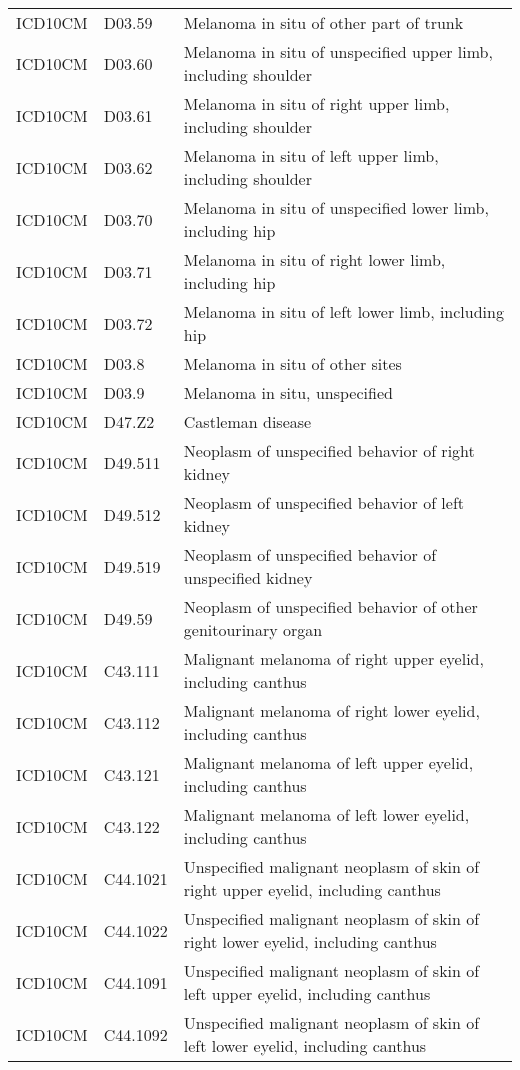 \begin{longtable}{p{}p{}p{}}
  ICD10CM & D03.59 & Melanoma in situ of other part of trunk \\ 
  ICD10CM & D03.60 & Melanoma in situ of unspecified upper limb, including shoulder \\ 
  ICD10CM & D03.61 & Melanoma in situ of right upper limb, including shoulder \\ 
  ICD10CM & D03.62 & Melanoma in situ of left upper limb, including shoulder \\ 
  ICD10CM & D03.70 & Melanoma in situ of unspecified lower limb, including hip \\ 
  ICD10CM & D03.71 & Melanoma in situ of right lower limb, including hip \\ 
  ICD10CM & D03.72 & Melanoma in situ of left lower limb, including hip \\ 
  ICD10CM & D03.8 & Melanoma in situ of other sites \\ 
  ICD10CM & D03.9 & Melanoma in situ, unspecified \\ 
  ICD10CM & D47.Z2 & Castleman disease \\ 
  ICD10CM & D49.511 & Neoplasm of unspecified behavior of right kidney \\ 
  ICD10CM & D49.512 & Neoplasm of unspecified behavior of left kidney \\ 
  ICD10CM & D49.519 & Neoplasm of unspecified behavior of unspecified kidney \\ 
  ICD10CM & D49.59 & Neoplasm of unspecified behavior of other genitourinary organ \\ 
  ICD10CM & C43.111 & Malignant melanoma of right upper eyelid, including canthus \\ 
  ICD10CM & C43.112 & Malignant melanoma of right lower eyelid, including canthus \\ 
  ICD10CM & C43.121 & Malignant melanoma of left upper eyelid, including canthus \\ 
  ICD10CM & C43.122 & Malignant melanoma of left lower eyelid, including canthus \\ 
  ICD10CM & C44.1021 & Unspecified malignant neoplasm of skin of right upper eyelid, including canthus \\ 
  ICD10CM & C44.1022 & Unspecified malignant neoplasm of skin of right lower eyelid, including canthus \\ 
  ICD10CM & C44.1091 & Unspecified malignant neoplasm of skin of left upper eyelid, including canthus \\ 
  ICD10CM & C44.1092 & Unspecified malignant neoplasm of skin of left lower eyelid, including canthus \\ 

\end{longtable}
